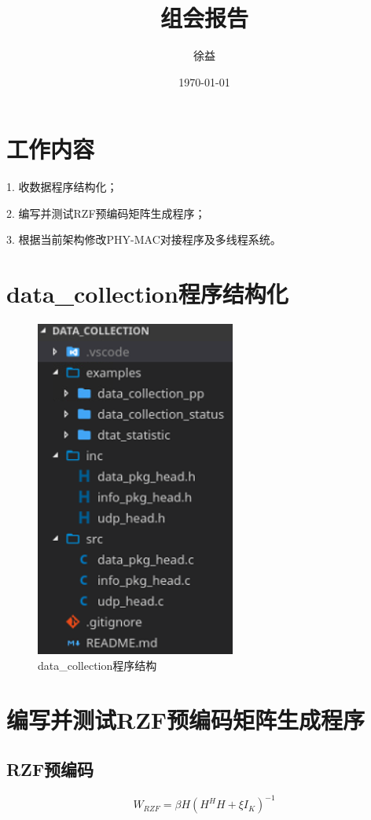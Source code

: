 \documentclass{article}
\title{组会报告}
\author{徐益}
\date{\today}
\begin{document}
\maketitle


\section{工作内容}
1. 收数据程序结构化；

2. 编写并测试RZF预编码矩阵生成程序；

3. 根据当前架构修改PHY-MAC对接程序及多线程系统。

\section{data\_collection程序结构化}
\begin{figure}[H]
	\centering
	\includegraphics[width = .45\textwidth]{datac.png}
	\caption{data\_collection程序结构}
\end{figure}

\section{编写并测试RZF预编码矩阵生成程序}
\subsection{RZF预编码}
\begin{equation}
W_{RZF}=\beta H(H^H H+\xi I_K)^{-1}
\end{equation}
\end{document}
